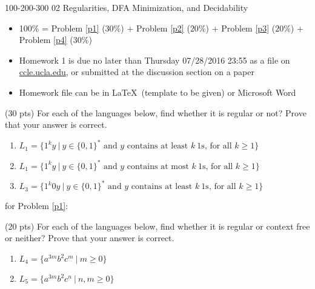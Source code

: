 \documentclass[usletter]{article}
\begin{document}
           {100-200-300}          		%
           {02}                     			%
           {Regularities, DFA Minimization, and Decidability}	%

\noindent

\begin{itemize}
\item 100\% = Problem \ref{p1} ($30\%$) + Problem \ref{p2} ($20\%$) + Problem \ref{p3} ($20\%$) + Problem \ref{p4} ($30\%$)
\item Homework 1 is due no later than Thursday 07/28/2016 23:55 as a file on \url{ccle.ucla.edu}, or submitted at the discussion section on a paper
\item Homework file can be in \LaTeX\ (template to be given) or Microsoft Word
\end{itemize}


\bigskip
\begin{problem}
\label{p1}

(30 pts) For each of the languages below, find whether it is regular or not? Prove that your answer is correct.

\begin{enumerate}[label=(\alph*)]
\item $L_1=\big\{ 1^ky\ |\ y \in \{0,1\}^* \text{ and } y \text{ contains at least } k\ 1\text{s, for all } k\ge 1 \big\}$
\item $L_1=\big\{ 1^ky\ |\ y \in \{0,1\}^* \text{ and } y \text{ contains at most } k\ 1\text{s, for all } k\ge 1 \big\}$
\item $L_3=\big\{ 1^k0y\ |\ y \in \{0,1\}^* \text{ and } y \text{ contains at least } k\ 1\text{s, for all } k\ge 1 \big\}$
\end{enumerate}

\end{problem}

\begin{answer}for Problem \ref{p1}:
\end{answer}











\bigskip
\begin{problem}
\label{p2}

(20 pts) For each of the languages below, find whether it is regular or context free or neither? Prove that your answer is correct.

\begin{enumerate}[label=(\alph*)]
\item $L_4=\big\{ a^{3m}b^2c^m\ |\ m\ge 0 \big\}$
\item $L_5=\big\{ a^{3m}b^2c^n\ |\ n,m\ge 0 \big\}$
\end{enumerate}

\end{problem}
\end{document}
